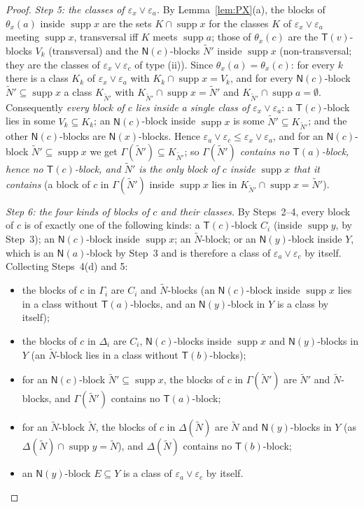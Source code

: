 \documentclass[11pt]{amsart}
\theoremstyle{definition}
\newcommand{\supp}{\operatorname{supp}}
\newcommand{\T}{\mathsf{T}}
\newcommand{\N}{\mathsf{N}}
\begin{document}
\begin{proof}
\emph{Step 5: the classes of $\varepsilon_x\vee\varepsilon_a$.} By Lemma~\ref{lem:PX}(a), the blocks of $\theta_x(a)$ inside $\supp x$ are the sets $K\cap\supp x$ for the classes $K$ of $\varepsilon_x\vee\varepsilon_a$ meeting $\supp x$, transversal iff $K$ meets $\supp a$; those of $\theta_x(c)$ are the $\T(v)$-blocks $V_k$ (transversal) and the $\N(c)$-blocks $\tilde N'$ inside $\supp x$ (non-transversal; they are the classes of $\varepsilon_x\vee\varepsilon_c$ of type (ii)). Since $\theta_x(a)=\theta_x(c)$: for every $k$ there is a class $K_k$ of $\varepsilon_x\vee\varepsilon_a$ with $K_k\cap\supp x=V_k$, and for every $\N(c)$-block $\tilde N'\subseteq\supp x$ a class $K_{\tilde N'}$ with $K_{\tilde N'}\cap\supp x=\tilde N'$ and $K_{\tilde N'}\cap\supp a=\emptyset$. Consequently \emph{every block of $c$ lies inside a single class of $\varepsilon_x\vee\varepsilon_a$}: a $\T(c)$-block lies in some $V_k\subseteq K_k$; an $\N(c)$-block inside $\supp x$ is some $\tilde N'\subseteq K_{\tilde N'}$; and the other $\N(c)$-blocks are $\N(x)$-blocks. Hence $\varepsilon_a\vee\varepsilon_c\le\varepsilon_x\vee\varepsilon_a$, and for an $\N(c)$-block $\tilde N'\subseteq\supp x$ we get $\Gamma(\tilde N')\subseteq K_{\tilde N'}$; so \emph{$\Gamma(\tilde N')$ contains no $\T(a)$-block, hence no $\T(c)$-block, and $\tilde N'$ is the only block of $c$ inside $\supp x$ that it contains} (a block of $c$ in $\Gamma(\tilde N')$ inside $\supp x$ lies in $K_{\tilde N'}\cap\supp x=\tilde N'$).

\emph{Step 6: the four kinds of blocks of $c$ and their classes.} By Steps~2--4, every block of $c$ is of exactly one of the following kinds: a $\T(c)$-block $C_i$ (inside $\supp y$, by Step~3); an $\N(c)$-block inside $\supp x$; an $\tilde N$-block; or an $\N(y)$-block inside $Y$, which is an $\N(a)$-block by Step~3 and is therefore a class of $\varepsilon_a\vee\varepsilon_c$ by itself. Collecting Steps~4(d) and 5:
\begin{itemize}[nosep]
\item[(1)] the blocks of $c$ in $\Gamma_i$ are $C_i$ and $\tilde N$-blocks (an $\N(c)$-block inside $\supp x$ lies in a class without $\T(a)$-blocks, and an $\N(y)$-block in $Y$ is a class by itself);
\item[(2)] the blocks of $c$ in $\Delta_i$ are $C_i$, $\N(c)$-blocks inside $\supp x$ and $\N(y)$-blocks in $Y$ (an $\tilde N$-block lies in a class without $\T(b)$-blocks);
\item[(3)] for an $\N(c)$-block $\tilde N'\subseteq\supp x$, the blocks of $c$ in $\Gamma(\tilde N')$ are $\tilde N'$ and $\tilde N$-blocks, and $\Gamma(\tilde N')$ contains no $\T(a)$-block;
\item[(4)] for an $\tilde N$-block $\tilde N$, the blocks of $c$ in $\Delta(\tilde N)$ are $\tilde N$ and $\N(y)$-blocks in $Y$ (as $\Delta(\tilde N)\cap\supp y=\tilde N$), and $\Delta(\tilde N)$ contains no $\T(b)$-block;
\item[(5)] an $\N(y)$-block $E\subseteq Y$ is a class of $\varepsilon_a\vee\varepsilon_c$ by itself.
\end{itemize}


\end{proof}
\end{document}

